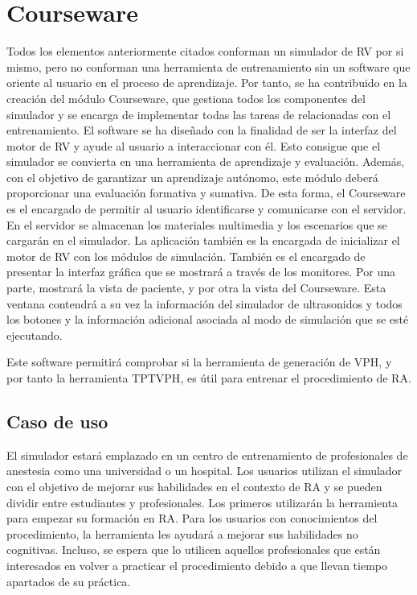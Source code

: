 \section{Courseware}
\label{rasim:courseware}
Todos los elementos anteriormente citados conforman un simulador de \ac{RV} por si mismo, pero no conforman una herramienta de entrenamiento sin un software que oriente al usuario en el proceso de aprendizaje. Por tanto, se ha contribuido en la creación del módulo \ac{Courseware}, que gestiona todos los componentes del simulador y se encarga de implementar todas las tareas de relacionadas con el entrenamiento. El software se ha diseñado con la finalidad de ser la interfaz del motor de \ac{RV} y ayude al usuario a interaccionar con él. Esto consigue que el simulador se convierta en una herramienta de aprendizaje y evaluación. Además, con el objetivo de garantizar un aprendizaje autónomo, este módulo deberá proporcionar una evaluación formativa y sumativa.  De esta forma, el \ac{Courseware} es el encargado de permitir al usuario identificarse y comunicarse con el servidor. En el servidor se almacenan los materiales multimedia y los escenarios que se cargarán en el simulador. La aplicación también es la encargada de inicializar el motor de \ac{RV} con los módulos de simulación. También es el encargado de presentar la interfaz gráfica que se mostrará a través de los monitores. Por una parte, mostrará la vista de paciente, y por otra la vista del \ac{Courseware}. Esta ventana contendrá a su vez la información del simulador de ultrasonidos y todos los botones y la información adicional asociada al modo de simulación que se esté ejecutando.

Este software permitirá comprobar si la herramienta de generación de \ac{VPH}, y por tanto la herramienta \ac{TPTVPH}, es útil para entrenar el procedimiento de \ac{RA}.



\subsection{Caso de uso}
\label{course:casodeuso}
El simulador estará emplazado en un centro de entrenamiento de profesionales de anestesia como una universidad o un hospital. Los usuarios utilizan el simulador con el objetivo de mejorar sus habilidades en el contexto de \ac{RA} y se pueden dividir entre estudiantes y profesionales. Los primeros utilizarán la herramienta para empezar su formación en \ac{RA}. Para los usuarios con conocimientos del procedimiento, la herramienta les ayudará a mejorar sus habilidades no cognitivas. Incluso, se espera que lo utilicen aquellos profesionales que están interesados en volver a practicar el procedimiento debido a que llevan tiempo apartados de su práctica.


